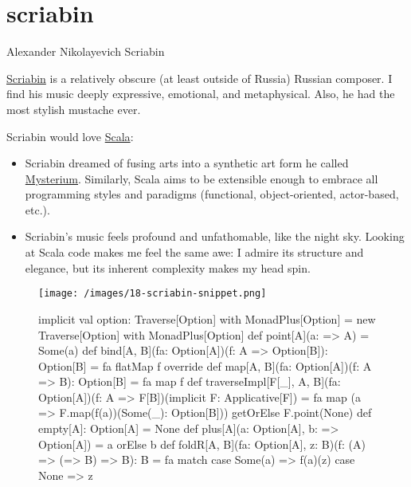 \documentclass{article}
\begin{document}
\section{scriabin}{Alexander Nikolayevich Scriabin}

\href{https://en.wikipedia.org/wiki/Alexander_Scriabin}{Scriabin} is a relatively obscure (at least outside of Russia) Russian composer.
I find his music deeply expressive, emotional, and metaphysical.
Also, he had the most stylish mustache ever.

Scriabin would love \href{https://scala-lang.org/}{Scala}:
\begin{itemize}
  \item
  Scriabin dreamed of fusing arts into a synthetic art form he called \href{https://en.wikipedia.org/wiki/Mysterium_(Scriabin)}{Mysterium}.
  Similarly, Scala aims to be extensible enough to embrace all programming styles and paradigms (functional, object-oriented, actor-based, etc.).
  \item
  Scriabin's music feels profound and unfathomable, like the night sky.
  Looking at Scala code makes me feel the same awe: I admire its structure and elegance, but its inherent complexity makes my head spin.
\end{itemize}

\begin{figure}[grayscale-diagram]
  \texttt{[image: /images/18-scriabin-snippet.png]}
\end{figure}
\begin{figure}
\begin{code}[scala]
implicit val option: Traverse[Option] with MonadPlus[Option] =
  new Traverse[Option] with MonadPlus[Option] {
    def point[A](a: => A) = Some(a)
    def bind[A, B](fa: Option[A])(f: A => Option[B]): Option[B] = fa flatMap f
    override def map[A, B](fa: Option[A])(f: A => B): Option[B] = fa map f
    def traverseImpl[F[_], A, B](fa: Option[A])(f: A => F[B])(implicit F: Applicative[F]) =
      fa map (a => F.map(f(a))(Some(_): Option[B])) getOrElse F.point(None)
    def empty[A]: Option[A] = None
    def plus[A](a: Option[A], b: => Option[A]) = a orElse b
    def foldR[A, B](fa: Option[A], z: B)(f: (A) => (=> B) => B): B = fa match {
      case Some(a) => f(a)(z)
      case None => z
    }
}
\end{code}
\end{figure}
\end{document}
